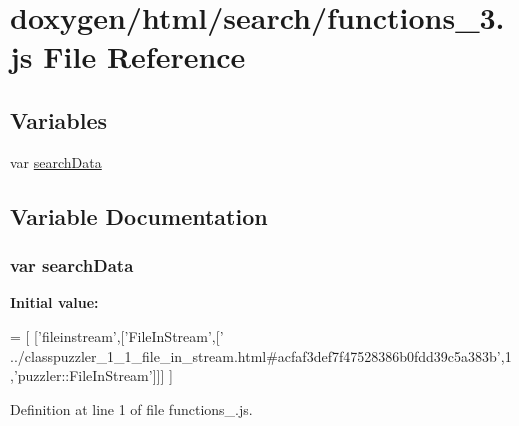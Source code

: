 \hypertarget{a00086}{}\section{doxygen/html/search/functions\+\_\+3.js File Reference}
\label{a00086}
\subsection*{Variables}
\begin{DoxyCompactItemize}
\item 
var \hyperlink{a00086_ad01a7523f103d6242ef9b0451861231e}{search\+Data}
\end{DoxyCompactItemize}


\subsection{Variable Documentation}
\hypertarget{a00086_ad01a7523f103d6242ef9b0451861231e}{}
\subsubsection[{search\+Data}]{\setlength{\rightskip}{0pt plus 5cm}var search\+Data}\label{a00086_ad01a7523f103d6242ef9b0451861231e}
{\bfseries Initial value\+:}
\begin{DoxyCode}
=
[
  [\textcolor{stringliteral}{'fileinstream'},[\textcolor{stringliteral}{'FileInStream'},[\textcolor{stringliteral}{'
      ../classpuzzler\_1\_1\_file\_in\_stream.html#acfaf3def7f47528386b0fdd39c5a383b'},1,\textcolor{stringliteral}{'puzzler::FileInStream'}]]]
]
\end{DoxyCode}


Definition at line 1 of file functions\+\_.\+js.

